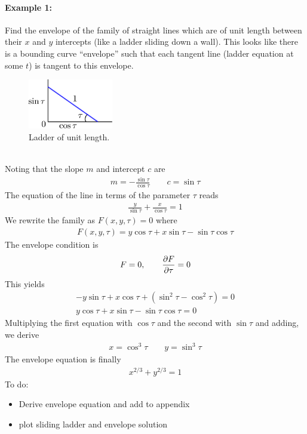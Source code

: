\paragraph{Example 1:} Find the envelope of the family of straight lines which are of unit length between their $x$ and $y$ intercepts (like a ladder sliding down a wall). This looks like there is a bounding curve ``envelope'' such that each tangent line (ladder equation at some $t$) is tangent to this envelope. 
\begin{figure}[!h]
	\centering
	\includegraphics[width=0.33\textwidth]{./plots/pdf/renormalization-ladder.pdf}
	\caption{Ladder of unit length.}
	\label{fig:wk27-ladder}
\end{figure}\\
Noting that the slope $m$ and intercept $c$ are
\begin{gather*}
	m = -\frac{\sin \tau}{\cos \tau} \qquad c = \sin \tau
\end{gather*}
The equation of the line in terms of the parameter $\tau$ reads
\begin{gather*}
	\frac{y}{\sin \tau} + \frac{x}{\cos \tau}  = 1
\end{gather*}
We rewrite the family as $F(x,y,\tau)=0$ where
\begin{gather*}
	F(x,y,\tau) = y \cos \tau + x \sin \tau - \sin\tau \cos\tau
\end{gather*}
The envelope condition is 
\begin{gather*}
	F=0, \qquad \frac{\partial F}{\partial \tau} = 0
\end{gather*}
This yields 
\begin{gather*}
	-y \sin \tau + x \cos \tau + (\sin^2 \tau - \cos^2\tau  ) = 0 \\
	y \cos \tau + x \sin \tau - \sin\tau \cos\tau = 0
\end{gather*}
Multiplying the first equation with $\cos \tau$ and the second with $\sin \tau$ and adding, we derive
\begin{gather*}
	x = \cos^3 \tau \qquad y = \sin^3 \tau
\end{gather*}
The envelope equation is finally
\begin{gather*}
	x^{2/3} + y^{2/3} = 1
\end{gather*}
{\color{red} To do:}
\begin{itemize}
	\item Derive envelope equation and add to appendix
	\item plot sliding ladder and envelope solution
\end{itemize}
